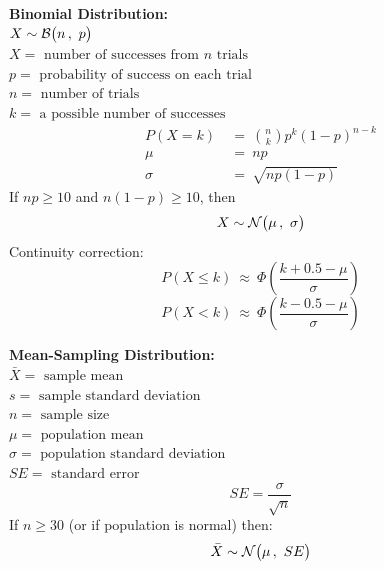 \documentclass[12pt,letterpaper,addpoints]{exam}
\begin{document}
\begin{multicols}{2}
{\bf Binomial Distribution:}\\
$X \sim \mathcal{B}\big(n\,,~p\big)$\\
$X = \text{ number of successes from $n$ trials} $\\
$p = \text{ probability of success on each trial}$\\
$n = \text{ number of trials}$\\
$k = \text{ a possible number of successes}$
\begin{align*}
P(X=k) ~&=~ {n \choose k} p^k (1-p)^{n-k}\\
\mu ~&=~ np\\
\sigma ~&=~ \sqrt{np(1-p)} 
\end{align*}
If $np \ge 10$ and $n(1-p) \ge 10$, then
$$X \sim \mathcal{N}\big(\mu\,,~\sigma\big) $$
Continuity correction:
$$P(X \le k) ~\approx~ \Phi\left(\frac{k+0.5-\mu}{\sigma}\right)$$
$$P(X < k) ~\approx~ \Phi\left(\frac{k-0.5-\mu}{\sigma}\right)$$



{\bf Mean-Sampling Distribution:}\\
$\bar{X} = \text{ sample mean}$\\
$s = \text{ sample standard deviation}$\\
$n = \text{ sample size}$\\
$\mu = \text{ population mean}$\\
$\sigma = \text{ population standard deviation}$\\
$SE = \text{ standard error}$
$$SE = \frac{\sigma}{\sqrt{n}} $$
If $n\ge 30$ (or if population is normal) then:
$$\bar{X} \sim \mathcal{N}\big(\mu\,,~SE\big) $$


\end{multicols}
\end{document}
